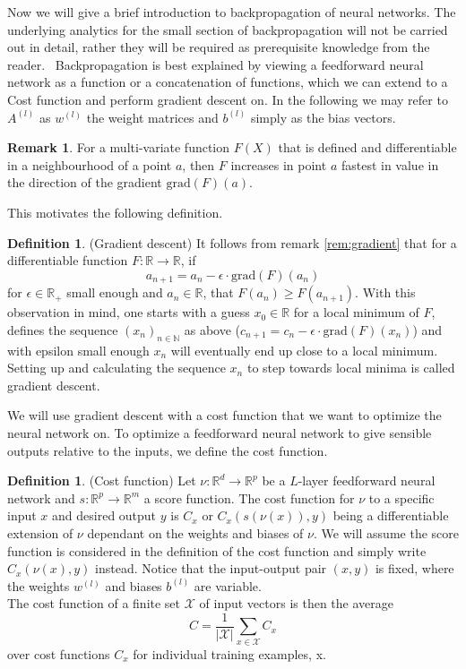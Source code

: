 \documentclass{article}
\theoremstyle{definition}
\newtheorem{definition}[theorem]{Definition}
\newtheorem{remark}[theorem]{Remark}
\begin{document}
Now we will give a brief introduction to backpropagation of neural networks. The underlying analytics for the small section of backpropagation will not be carried out in detail, rather they will be required as prerequisite knowledge from the reader. \
Backpropagation is best explained by viewing a feedforward neural network as a function or a concatenation of functions, which we can extend to a Cost function and perform gradient descent on.
In the following we may refer to $A^{(l)}$ as $w^{(l)}$ the weight matrices and $b^{(l)}$ simply as the bias vectors.

\begin{remark}
For a multi-variate function $F(X)$ that is defined and differentiable in a neighbourhood of a point $a$, then $F$ increases in point $a$ fastest in value in the direction of the gradient $\text{grad}(F)(a)$.
\end{remark}\label{rem:gradient}
This motivates the following definition.

\begin{definition}(Gradient descent)
It follows from remark \ref{rem:gradient} that for a differentiable function $F: \mathbb{R} \to \mathbb{R}$, if 
$$a_{n+1}=a_{n}-\epsilon \cdot \text{grad}(F)(a_{n})$$
for $\epsilon \in \mathbb{R}_{+}$ small enough and $a_{n} \in \mathbb{R}$, that $F(a_{n}) \geq F(a_{n+1})$. With this observation in mind, one starts with a guess $x_{0} \in \mathbb{R}$ for a local minimum of $F$, defines the sequence $(x_{n})_{n\in\mathbb{N}}$ as above ($c_{n+1}=c_{n}-\epsilon \cdot \text{grad}(F)(x_{n})$) and with epsilon small enough $x_{n}$ will eventually end up close to a local minimum. Setting up and calculating the sequence $x_{n}$ to step towards local minima is called gradient descent.
\end{definition}

We will use gradient descent with a cost function that we want to optimize the neural network on. To optimize a feedforward neural network to give sensible outputs relative to the inputs, we define the cost function.

\begin{definition}(Cost function)
\label{def:cost_fct}
Let $\nu : \mathbb{R}^{d} \to \mathbb{R}^{p}$ be a $L$-layer feedforward neural network and $s : \mathbb{R}^{p} \to \mathbb{R}^{m}$ a score function. The cost function for $\nu$ to a specific input $x$ and desired output $y$ is $C_{x}$ or $C_{x}(s(\nu(x)), y)$ being a differentiable extension of $\nu$ dependant on the weights and biases of $\nu$. We will assume the score function is considered in the definition of the cost function and simply write $C_{x}(\nu(x), y)$ instead. Notice that the input-output pair $(x, y)$ is fixed, where the weights $w^{(l)}$ and biases $b^{(l)}$ are variable. \\
The cost function of a finite set $\mathcal{X}$ of input vectors is then the average $$C=\frac{1}{|\mathcal{X}|}\sum_{x \in \mathcal{X}}C_{x}$$
over cost functions $C_{x}$ for individual training examples, x.
\end{definition}
\end{document}
